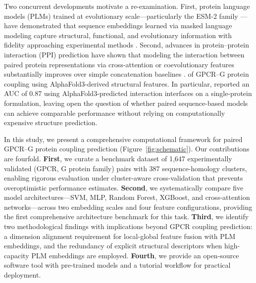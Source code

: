 \documentclass[11pt,a4paper]{article}
\begin{document}
Two concurrent developments motivate a re-examination. First, protein language models (PLMs) trained at evolutionary scale---particularly the ESM-2 family \cite{lin2023evolutionary}---have demonstrated that sequence embeddings learned via masked language modeling capture structural, functional, and evolutionary information with fidelity approaching experimental methods \cite{rives2021biological, elnaggar2021prottrans}. Second, advances in protein--protein interaction (PPI) prediction have shown that modeling the interaction between paired protein representations via cross-attention \cite{vaswani2017attention} or coevolutionary features \cite{cong2019protein} substantially improves over simple concatenation baselines \cite{sledzieski2021dscript, hashemifar2018predicting, chen2019transform}.
\cite{miglionico2025predicting} of GPCR--G protein coupling using AlphaFold3-derived structural features. In particular, \cite{miglionico2025predicting} reported an AUC of 0.87 using AlphaFold3-predicted interaction interfaces on a single-protein formulation, leaving open the question of whether paired sequence-based models can achieve comparable performance without relying on computationally expensive structure prediction.

In this study, we present a comprehensive computational framework for paired GPCR--G protein coupling prediction (Figure~\ref{fig:schematic}). Our contributions are fourfold. \textbf{First}, we curate a benchmark dataset of 1,647 experimentally validated (GPCR, G protein family) pairs with 387 sequence-homology clusters, enabling rigorous evaluation under cluster-aware cross-validation that prevents overoptimistic performance estimates. \textbf{Second}, we systematically compare five model architectures---SVM, MLP, Random Forest, XGBoost, and cross-attention networks---across two embedding scales and four feature configurations, providing the first comprehensive architecture benchmark for this task. \textbf{Third}, we identify two methodological findings with implications beyond GPCR coupling prediction: a dimension alignment requirement for local-global feature fusion with PLM embeddings, and the redundancy of explicit structural descriptors when high-capacity PLM embeddings are employed. \textbf{Fourth}, we provide an open-source software tool with pre-trained models and a tutorial workflow for practical deployment.

\end{document}
